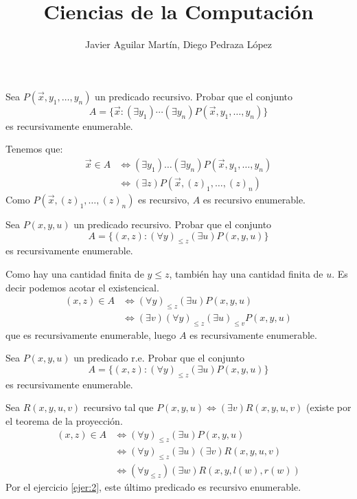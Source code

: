 \documentclass[twoside]{article}
\newcommand{\sii}{{\Leftrightarrow}}
\begin{document}
\title{Ciencias de la Computación}

\author{Javier Aguilar Martín, Diego Pedraza López}
\maketitle

\begin{ejercicio}{1}
Sea $P(\vec{x},y_1,\dots,y_n)$ un predicado recursivo. Probar que el conjunto
\[ A = \{\vec{x} : (\exists y_1)\cdots(\exists y_n) P(\vec{x},y_1,\dots,y_n)\} \]
es recursivamente enumerable.
\end{ejercicio}
\begin{solucion}
Tenemos que:
\begin{align*}
	\vec{x} \in A & \sii (\exists y_1)\dots(\exists y_n) P(\vec{x},y_1,\dots,y_n)\\
	& \sii (\exists z) P(\vec{x},(z)_1,\dots,(z)_n)
\end{align*}
Como $P(\vec{x},(z)_1,\dots,(z)_n)$ es recursivo, $A$ es recursivo enumerable.
\end{solucion}

\newpage

\begin{ejercicio}{2}
Sea $P(x,y,u)$ un predicado recursivo. Probar que el conjunto
\[ A = \{(x,z) : (\forall y)_{≤z} (\exists u) P(x,y,u)\} \]
es recursivamente enumerable.
\end{ejercicio}
\begin{solucion}
Como hay una cantidad finita de $y≤z$, también hay una cantidad finita de $u$. Es decir podemos acotar el existencical.
\begin{align*}
	(x,z) \in A & \sii (\forall y)_{≤z} (\exists u) P(x,y,u)\\
	& \sii (\exists v)(\forall y)_{≤z} (\exists u)_{≤v} P(x,y,u)
\end{align*}
 que es recursivamente enumerable, luego $A$ es recursivamente enumerable.
\end{solucion}

\newpage

\begin{ejercicio}{3}
Sea $P(x,y,u)$ un predicado r.e. Probar que el conjunto
\[ A = \{(x,z) : (\forall y)_{≤z} (\exists u) P(x,y,u)\} \]
es recursivamente enumerable.
\end{ejercicio}
\begin{solucion}
Sea $R(x,y,u,v)$ recursivo tal que $P(x,y,u) \sii (\exists v) R(x,y,u,v)$ (existe por el teorema de la proyección.
\begin{align*}
	(x,z) \in A & \sii (\forall y)_{≤z} (\exists u) P(x,y,u)\\
	& \sii (\forall y)_{≤z} (\exists u) (\exists v) R(x,y,u,v)\\
	& \sii (\forall y_{≤z}) (\exists w) R(x,y,l(w),r(w))
\end{align*}
Por el ejercicio \ref{ejer:2}, este último predicado es recursivo enumerable. 
\end{solucion}
\end{document}

